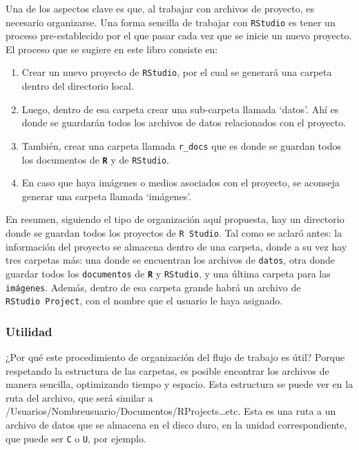 \documentclass[
]{article}
\begin{document}
Una de los aspectos clave es que, al trabajar con archivos de proyecto, es necesario organizarse. Una forma sencilla de trabajar con \texttt{RStudio} es tener un proceso pre-establecido por el que pasar cada vez que se inicie un nuevo proyecto. El proceso que se sugiere en este libro consiste en:

\begin{enumerate}
\def\labelenumi{\arabic{enumi}.}
\item
  Crear un nuevo proyecto de \texttt{RStudio}, por el cual se generará una carpeta dentro del directorio local.
\item
  Luego, dentro de esa carpeta crear una sub-carpeta llamada `datos'. Ahí es donde se guardarán todos los archivos de datos relacionados con el proyecto.
\item
  También, crear una carpeta llamada \texttt{r\_docs} que es donde se guardan todos los documentos de \textbf{\texttt{R}} y de \texttt{RStudio}.
\item
  En caso que haya imágenes o medios asociados con el proyecto, se aconseja generar una carpeta llamada `imágenes'.
\end{enumerate}

En resumen, siguiendo el tipo de organización aquí propuesta, hay un directorio donde se guardan todos los proyectos de \texttt{R\ Studio}. Tal como se aclaró antes: la información del proyecto se almacena dentro de una carpeta, donde a su vez hay tres carpetas más: una donde se encuentran los archivos de \texttt{datos}, otra donde guardar todos los \texttt{documentos} de \textbf{\texttt{R}} y \texttt{RStudio}, y una última carpeta para las \texttt{imágenes}. Además, dentro de esa carpeta grande habrá un archivo de \texttt{RStudio\ Project}, con el nombre que el usuario le haya asignado.

\hypertarget{utilidad}{%
\subsubsection{Utilidad}\label{utilidad}}

¿Por qué este procedimiento de organización del flujo de trabajo es útil? Porque respetando la estructura de las carpetas, es posible encontrar los archivos de manera sencilla, optimizando tiempo y espacio. Esta estructura se puede ver en la ruta del archivo, que será similar a /Usuarios/Nombreusuario/Documentos/RProjects\ldots etc. Esta es una ruta a un archivo de datos que se almacena en el disco duro, en la unidad correspondiente, que puede ser \texttt{C} o \texttt{U}, por ejemplo.
\end{document}
